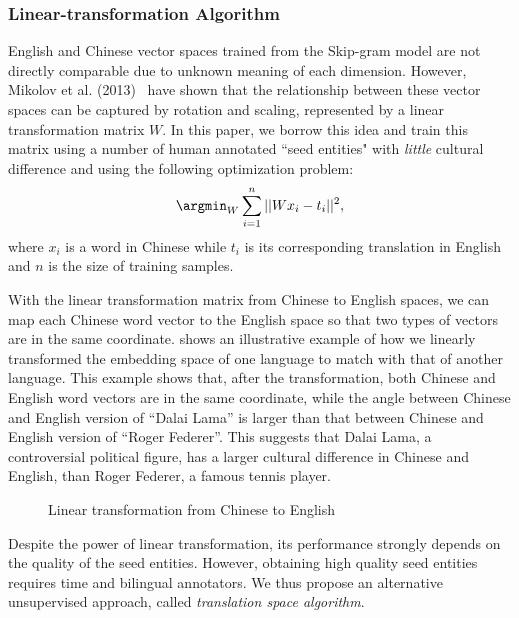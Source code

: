 \subsubsection{Linear-transformation Algorithm}


English and Chinese vector spaces trained from the Skip-gram model
are not directly comparable due to unknown meaning of each dimension.
However, Mikolov et al. (2013)~\cite{Mikolov:2013tp} have shown that
the relationship between these vector spaces can be captured by
rotation and scaling, represented by a linear transformation matrix $W$.
In this paper, we borrow this idea and train this matrix
using a number of human annotated ``seed entities" with {\em little}
cultural difference and using the following optimization problem:
\begin{align}
\argmin_{W}\sum_{i=1}^{n} || Wx_{i}-t_{i} ||^2,
\end{align}
where $x_{i}$ is a word in Chinese while $t_{i}$ is its
corresponding translation in English and $n$ is the size of
training samples.

With the linear transformation matrix from Chinese to English spaces, we can map each Chinese word vector to the English space so that two types of vectors are in the same coordinate.
 shows an illustrative example
of how we linearly transformed the embedding space of one language
to match with that of another language.
This example shows that, after the transformation,
both Chinese and English word vectors are in the same coordinate,
while the angle between Chinese and English version of ``Dalai Lama''
is larger than that between Chinese and English version of ``Roger Federer''.
This suggests that Dalai Lama, a controversial political figure,
has a larger cultural difference in Chinese and English, than Roger Federer,
a famous tennis player.

\begin{figure}[t]
	\centering
	\caption{Linear transformation from Chinese to English}
	\label{fig:embeddingspace}
\end{figure}


Despite the power of linear transformation, its performance strongly
depends on the quality of the seed entities.
However, obtaining high quality seed entities requires time and bilingual annotators.
We thus propose an alternative unsupervised approach, called \emph{translation space algorithm}.

